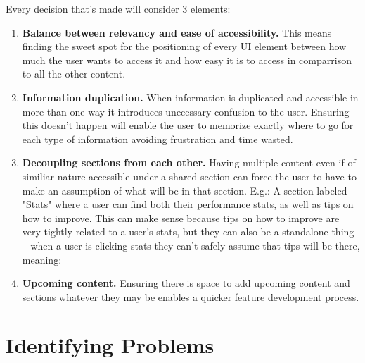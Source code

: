\documentclass[a4paper,12pt]{article}
\begin{document}
Every decision that's made will consider 3 elements:
\begin{enumerate}[label=\textbf{\arabic*})]
    \item \textbf{Balance between relevancy and ease of accessibility.} This means finding the sweet spot for the positioning of every UI element between how much the user wants to access it and how easy it is to access in comparrison to all the other content.
    \item \textbf{Information duplication.} When information is duplicated and accessible in more than one way it introduces unecessary confusion to the user. Ensuring this doesn't happen will enable the user to memorize exactly where to go for each type of information avoiding frustration and time wasted.
    \item \textbf{Decoupling sections from each other.} Having multiple content even if of similiar nature accessible under a shared section can force the user to have to make an assumption of what will be in that section. E.g.: A section labeled "Stats" where a user can find both their performance stats, as well as tips on how to improve. This can make sense because tips on how to improve are very tightly related to a user's stats, but they can also be a standalone thing -- when a user is clicking stats they can't safely assume that tips will be there, meaning:
    \item \textbf{Upcoming content.} Ensuring there is space to add upcoming content and sections whatever they may be enables a quicker feature development process.
\end{enumerate}

\newpage
\section{Identifying Problems}
\end{document}
